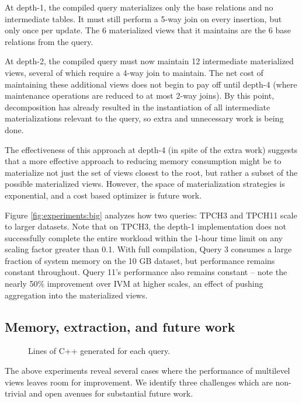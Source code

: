 At depth-1, the compiled query materializes only the base relations and no intermediate tables.  It must still perform a 5-way join on every insertion, but  only once per update.  The 6 materialized views that it maintains are the 6 base relations from the query.  

At depth-2, the compiled query must now maintain 12 intermediate materialized views, several of which require a 4-way join to maintain.  The net cost of maintaining these additional views does not begin to pay off until depth-4 (where maintenance operations are reduced to at most 2-way joins).  By this point, decomposition has already resulted in the instantiation of all intermediate materializations relevant to the query, so extra and unnecessary work is being done.  

The effectiveness of this approach at depth-4 (in spite of the extra work) suggests that a more effective approach to reducing memory consumption might be to materialize not just the set of views closest to the root, but rather a subset of the possible materialized views.  However, the space of materialization strategies is exponential, and a cost based optimizer is future work.

Figure \ref{fig:experiments:big} analyzes how two queries: TPCH3 and TPCH11 scale to larger datasets.  Note that on TPCH3, the depth-1 implementation does not successfully complete the entire workload within the 1-hour time limit on any scaling factor greater than 0.1.  With full compilation, Query 3 consumes a large fraction of system memory on the 10 GB dataset, but performance remains constant throughout.  Query 11's performance also remains constant -- note the nearly 50\% improvement over IVM at higher scales, an effect of pushing aggregation into the materialized views.

\subsection{Memory, extraction, and future work}
\label{sec:experiments:future}

\begin{figure}
\begin{center}

\caption{Lines of C++ generated for each query.}
\label{fig:experiments:loc}
\end{center}
\vspace*{-0.35in}
\end{figure}

The above experiments reveal several cases where the performance of multilevel views leaves room for improvement.  We identify three challenges which are non-trivial and open avenues for substantial future work.

